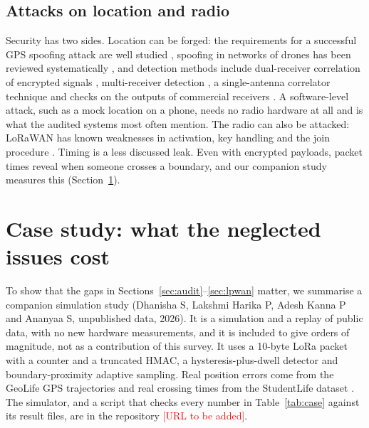 \documentclass[preprint,12pt]{elsarticle}
\newcommand{\todo}[1]{\textcolor{red}{[#1]}}
\begin{document}
\subsection{Attacks on location and radio}\label{sec:sec}

Security has two sides. Location can be forged: the requirements for a successful GPS spoofing attack are well studied \cite{tippenhauer2011spoofing,psiaki2016gnss}, spoofing in networks of drones has been reviewed systematically \cite{altaweel2023spoofing}, and detection methods include dual-receiver correlation of encrypted signals \cite{psiaki2013spoofing}, multi-receiver detection \cite{jansen2016multi}, a single-antenna correlator technique \cite{schmidt2020spoofing} and checks on the outputs of commercial receivers \cite{manfredini2018effective}. A software-level attack, such as a mock location on a phone, needs no radio hardware at all and is what the audited systems most often mention. The radio can also be attacked: LoRaWAN has known weaknesses in activation, key handling and the join procedure \cite{yang2018security,aras2017exploring,butun2018security,tomasin2017security,ruotsalainen2022lorawan,hessel2022lorawan}. Timing is a less discussed leak. Even with encrypted payloads, packet times reveal when someone crosses a boundary, and our companion study measures this (Section~\ref{sec:case}).

\section{Case study: what the neglected issues cost}\label{sec:case}
To show that the gaps in Sections~\ref{sec:audit}--\ref{sec:lpwan} matter, we summarise a companion simulation study (Dhanisha S, Lakshmi Harika P, Adesh Kanna P and Ananyaa S, unpublished data, 2026). It is a simulation and a replay of public data, with no new hardware measurements, and it is included to give orders of magnitude, not as a contribution of this survey. It uses a 10-byte LoRa packet with a counter and a truncated HMAC, a hysteresis-plus-dwell detector and boundary-proximity adaptive sampling. Real position errors come from the GeoLife GPS trajectories \cite{zheng2009geolife} and real crossing times from the StudentLife dataset \cite{wang2014studentlife}. The simulator, and a script that checks every number in Table~\ref{tab:case} against its result files, are in the repository \todo{URL to be added}.
\end{document}
